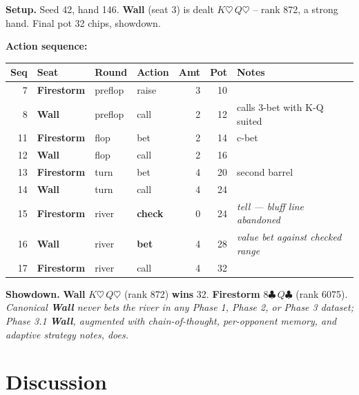 \documentclass[10pt]{article} %
\newcommand{\arch}[1]{\textbf{#1}}
\begin{document}
\begin{tcolorbox}[storyhand={Box~2.\quad The inversion in a single hand (Phase 3.1 hand \#146, 17 actions, 32-chip pot)}]
\scriptsize
\textbf{Setup.} Seed 42, hand 146. \arch{Wall} (seat 3) is dealt
$K\heartsuit\,Q\heartsuit$ -- rank 872, a strong hand. Final pot
32 chips, showdown.

\smallskip
\noindent\textbf{Action sequence:}\par\nopagebreak
\begin{center}
\setlength{\tabcolsep}{3pt}\begin{tabularx}{\linewidth}{@{}rlllrr>{\raggedright\arraybackslash}X@{}}
\toprule
Seq & Seat & Round & Action & Amt & Pot & Notes \\
\midrule
 7 & \arch{Firestorm} & preflop & raise          & 3 & 10 &  \\
 8 & \arch{Wall}      & preflop & call           & 2 & 12 & calls 3-bet with K-Q suited \\
11 & \arch{Firestorm} & flop    & bet            & 2 & 14 & c-bet \\
12 & \arch{Wall}      & flop    & call           & 2 & 16 &  \\
13 & \arch{Firestorm} & turn    & bet            & 4 & 20 & second barrel \\
14 & \arch{Wall}      & turn    & call           & 4 & 24 &  \\
15 & \arch{Firestorm} & river   & \textbf{check} & 0 & 24 & \textit{tell --- bluff line abandoned} \\
16 & \arch{Wall}      & river   & \textbf{bet}   & 4 & 28 & \textit{value bet against checked range} \\
17 & \arch{Firestorm} & river   & call           & 4 & 32 &  \\
\bottomrule
\end{tabularx}
\end{center}

\smallskip
\noindent\textbf{Showdown.}
\arch{Wall} $K\heartsuit\,Q\heartsuit$ (rank 872) \textbf{wins} 32.
\arch{Firestorm} $8\clubsuit\,Q\clubsuit$ (rank 6075).
\textit{Canonical \arch{Wall} never bets the river in any Phase 1,
Phase 2, or Phase 3 dataset; Phase 3.1 \arch{Wall}, augmented with
chain-of-thought, per-opponent memory, and adaptive strategy
notes, does.}
\end{tcolorbox}

\section{Discussion}
\end{document}
